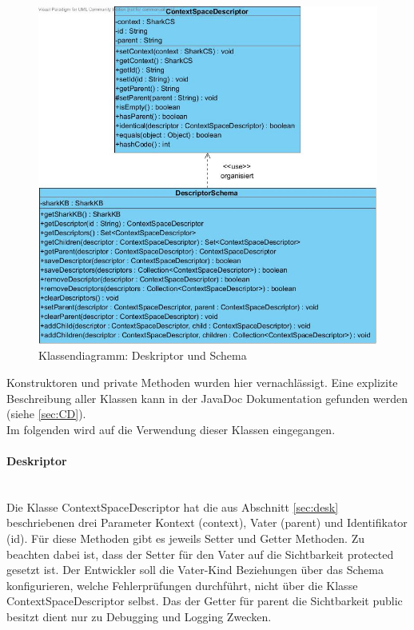 \documentclass[a4paper]{article}
\begin{document}
	\begin{figure}[H]
		\centerline{
			\includegraphics[scale=0.53]{../Bilder/impl_schema.jpg}
		}
		\caption{Klassendiagramm: Deskriptor und Schema}
		\label{fig:impl_schema}
	\end{figure}	
	
	Konstruktoren und private Methoden wurden hier vernachlässigt. Eine
	explizite Beschreibung aller Klassen kann in der JavaDoc Dokumentation gefunden
	werden (siehe \autoref{sec:CD}). \\
	
	Im folgenden wird auf die Verwendung dieser Klassen eingegangen.
		
	\paragraph{Deskriptor}\mbox{} \\
	
	Die Klasse ContextSpaceDescriptor hat die aus Abschnitt \ref{sec:desk} 
	beschriebenen drei Parameter Kontext (context), Vater (parent) und
	Identifikator (id). Für diese Methoden gibt es jeweils Setter und Getter
	Methoden. Zu beachten dabei ist, dass der Setter für den Vater auf die
	Sichtbarkeit protected gesetzt ist. Der Entwickler soll die	Vater-Kind
	Beziehungen über das Schema konfigurieren, welche Fehlerprüfungen durchführt,
	nicht über die Klasse ContextSpaceDescriptor selbst. Das der Getter für
	parent die Sichtbarkeit public besitzt dient nur zu Debugging und Logging
	Zwecken.\\
	
\end{document}
